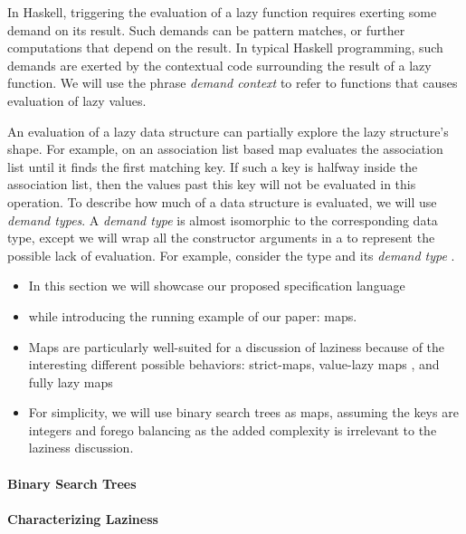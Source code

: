 \documentclass[acmsmall,review]{acmart}\settopmatter{}
\begin{document}
In Haskell, triggering the evaluation of a lazy function requires
exerting some demand on its result. Such demands can be pattern
matches, or further computations that depend on the result. In typical
Haskell programming, such demands are exerted by the contextual code
surrounding the result of a lazy function. We will use the
phrase \textit{demand context} to refer to functions that causes
evaluation of lazy values.

An evaluation of a lazy data structure can partially explore the lazy
structure's shape. For example,  on an association list
based map evaluates the association list until it finds the first
matching key. If such a key is halfway inside the association list,
then the values past this key will not be evaluated in this operation.
%
To describe how much of a data structure is evaluated, we will
use \textit{demand types}. A \textit{demand type} is almost isomorphic
to the corresponding data type, except we will wrap all the
constructor arguments in a  to represent the possible lack
of evaluation. For example, consider the  type and
its \textit{demand type} .


\begin{itemize}
\item In this section we will showcase our proposed specification language 
\item while introducing the running example of our paper: maps.
\item Maps are particularly well-suited for a discussion of laziness because of the interesting different
possible behaviors: strict-maps, value-lazy maps , and fully lazy maps
\item For simplicity, we will use binary search trees as maps, assuming the keys are integers and forego balancing
as the added complexity is irrelevant to the laziness discussion. 
\end{itemize}

\paragraph*{Binary Search Trees}


\paragraph*{Characterizing Laziness}
\end{document}
